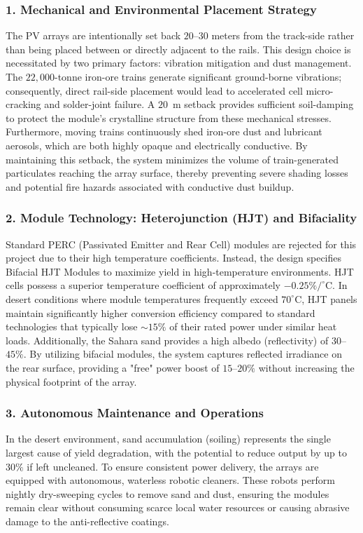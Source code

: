 \subsubsection*{1. Mechanical and Environmental Placement Strategy}The PV arrays are intentionally set back $20$--$30$ meters from the track-side rather than being placed between or directly adjacent to the rails. This design choice is necessitated by two primary factors: vibration mitigation and dust management. The $22,000$-tonne iron-ore trains generate significant ground-borne vibrations; consequently, direct rail-side placement would lead to accelerated cell micro-cracking and solder-joint failure. A $20$~m setback provides sufficient soil-damping to protect the module's crystalline structure from these mechanical stresses. Furthermore, moving trains continuously shed iron-ore dust and lubricant aerosols, which are both highly opaque and electrically conductive. By maintaining this setback, the system minimizes the volume of train-generated particulates reaching the array surface, thereby preventing severe shading losses and potential fire hazards associated with conductive dust buildup.
\subsubsection*{2. Module Technology: Heterojunction (HJT) and Bifaciality}Standard PERC (Passivated Emitter and Rear Cell) modules are rejected for this project due to their high temperature coefficients. Instead, the design specifies Bifacial HJT Modules to maximize yield in high-temperature environments. HJT cells possess a superior temperature coefficient of approximately $-0.25\%/^\circ\text{C}$. In desert conditions where module temperatures frequently exceed $70^\circ\text{C}$, HJT panels maintain significantly higher conversion efficiency compared to standard technologies that typically lose $\sim 15\%$ of their rated power under similar heat loads. Additionally, the Sahara sand provides a high albedo (reflectivity) of $30$--$45\%$. By utilizing bifacial modules, the system captures reflected irradiance on the rear surface, providing a "free" power boost of $15$--$20\%$ without increasing the physical footprint of the array.
\subsubsection*{3. Autonomous Maintenance and Operations}In the desert environment, sand accumulation (soiling) represents the single largest cause of yield degradation, with the potential to reduce output by up to $30\%$ if left uncleaned. To ensure consistent power delivery, the arrays are equipped with autonomous, waterless robotic cleaners. These robots perform nightly dry-sweeping cycles to remove sand and dust, ensuring the modules remain clear without consuming scarce local water resources or causing abrasive damage to the anti-reflective coatings.
